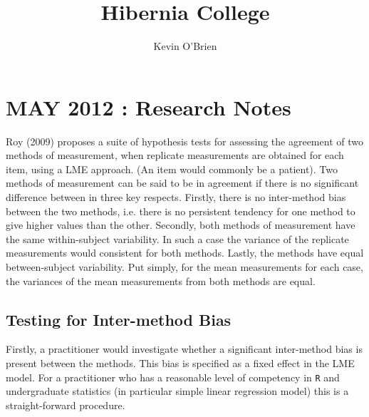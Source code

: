 \documentclass[12pt]{article} %
\title{Hibernia College}
\author{Kevin O'Brien}
\begin{document}
\maketitle
\tableofcontents
\newpage
\section{MAY 2012 : Research Notes}
Roy (2009) proposes a suite of hypothesis tests for assessing the agreement of two methods of measurement, when replicate measurements are obtained for each item, using a LME approach. (An item would commonly be a patient).  Two methods of measurement can be said to be in agreement if there is no significant difference between in three key respects. Firstly, there is no inter-method bias between the two methods, i.e. there is no persistent tendency for one method to give higher values than the other.
Secondly, both methods of measurement have the same  within-subject variability. In such a case the variance of the replicate measurements would consistent for both methods.
Lastly, the methods have equal between-subject variability.  Put simply, for the mean measurements for each case, the variances of the mean measurements from both methods are equal.
\subsection{Testing for Inter-method Bias}
Firstly, a practitioner would investigate whether a significant inter-method bias is present between the methods. This bias is specified as a fixed effect in the LME model.  For a practitioner who has a reasonable level of competency in \texttt{R} and undergraduate statistics (in particular simple linear regression model) this is a straight-forward procedure.
\end{document}
